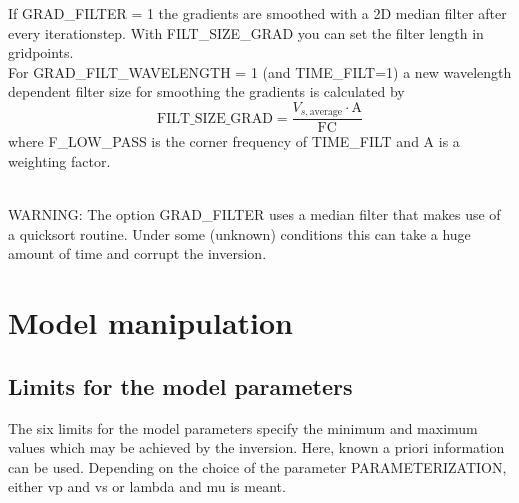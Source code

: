 If GRAD\_FILTER = 1 the gradients are smoothed with a 2D median filter after every iterationstep. With FILT\_SIZE\_GRAD you can set the filter length in gridpoints.\\
For GRAD\_FILT\_WAVELENGTH = 1 (and TIME\_FILT=1) a new wavelength dependent filter size for smoothing the gradients is calculated by
\begin{equation}
 \mbox{FILT\_SIZE\_GRAD} = \frac{V_{s,\text{average}}\cdot \text{A}}{\text{FC}}
\end{equation}
where F\_LOW\_PASS is the corner frequency of TIME\_FILT and A is a weighting factor.

\ \\
WARNING: The option GRAD\_FILTER uses a median filter that makes use of a quicksort routine. Under some (unknown) conditions this can take a huge amount of time and corrupt the inversion.


\section{Model manipulation}
\subsection{Limits for the model parameters}
{\color{blue}{\begin{verbatim}
"Upper and lower limits for model parameters" : "comment",
			"VPUPPERLIM" : "3500",
			"VPLOWERLIM" : "0",
			"VSUPPERLIM" : "5000",
			"VSLOWERLIM" : "0",
			"RHOUPPERLIM" : "5000",
			"RHOLOWERLIM" : "0",
\end{verbatim}}}

{\color{red}{\begin{verbatim}
Default values are:
VPUPPERLIM=25000.0
VPLOWERLIM=0.0
VSUPPERLIM=25000.0
VSLOWERLIM=0.0
RHOUPPERLIM=25000.0
RHOLOWERLIM=0.0
\end{verbatim}}}

The six limits for the model parameters specify the minimum and maximum values which may be achieved by the inversion. Here, known a priori information can be used. Depending on the choice of the parameter PARAMETERIZATION, either vp and vs or lambda and mu is meant.

